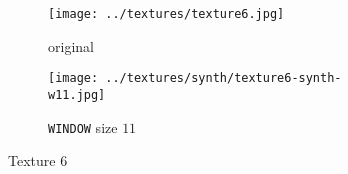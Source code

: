 \documentclass{article}
\begin{document}
\begin{figure}[H]
	\begin{subfigure}{0.5\textwidth}
		\centering
		\texttt{[image: ../textures/texture6.jpg]}
		\caption{original}
		\label{text-6-orig}
	\end{subfigure}%
	\begin{subfigure}{0.5\textwidth}
		\centering
		\texttt{[image: ../textures/synth/texture6-synth-w11.jpg]}
		\caption{\texttt{WINDOW} size $11$}
		\label{text-6-w11}
	\end{subfigure}%
	\caption{Texture 6}
	\label{text-6}
\end{figure}



\end{document}
